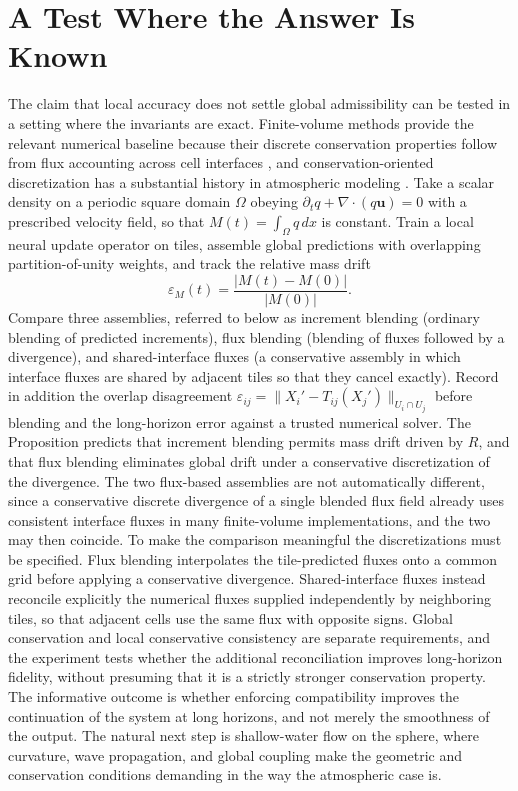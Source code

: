 \documentclass[11pt]{article}
\theoremstyle{definition}
\theoremstyle{remark}
\begin{document}
\section{A Test Where the Answer Is Known}

The claim that local accuracy does not settle global admissibility can be tested in a setting where the invariants are exact. Finite-volume methods provide the relevant numerical baseline because their discrete conservation properties follow from flux accounting across cell interfaces \cite{leveque2002finite}, and conservation-oriented discretization has a substantial history in atmospheric modeling \cite{arakawa1977computational}. Take a scalar density on a periodic square domain $\Omega$ obeying $\partial_t q + \nabla\!\cdot(q\mathbf u) = 0$ with a prescribed velocity field, so that $M(t) = \int_\Omega q\,dx$ is constant. Train a local neural update operator on tiles, assemble global predictions with overlapping partition-of-unity weights, and track the relative mass drift
\begin{equation}
\varepsilon_M(t) = \frac{|M(t)-M(0)|}{|M(0)|}.
\end{equation}
Compare three assemblies, referred to below as increment blending (ordinary blending of predicted increments), flux blending (blending of fluxes followed by a divergence), and shared-interface fluxes (a conservative assembly in which interface fluxes are shared by adjacent tiles so that they cancel exactly). Record in addition the overlap disagreement $\varepsilon_{ij} = \|X_i' - T_{ij}(X_j')\|_{U_i\cap U_j}$ before blending and the long-horizon error against a trusted numerical solver. The Proposition predicts that increment blending permits mass drift driven by $R$, and that flux blending eliminates global drift under a conservative discretization of the divergence. The two flux-based assemblies are not automatically different, since a conservative discrete divergence of a single blended flux field already uses consistent interface fluxes in many finite-volume implementations, and the two may then coincide. To make the comparison meaningful the discretizations must be specified. Flux blending interpolates the tile-predicted fluxes onto a common grid before applying a conservative divergence. Shared-interface fluxes instead reconcile explicitly the numerical fluxes supplied independently by neighboring tiles, so that adjacent cells use the same flux with opposite signs. Global conservation and local conservative consistency are separate requirements, and the experiment tests whether the additional reconciliation improves long-horizon fidelity, without presuming that it is a strictly stronger conservation property. The informative outcome is whether enforcing compatibility improves the continuation of the system at long horizons, and not merely the smoothness of the output. The natural next step is shallow-water flow on the sphere, where curvature, wave propagation, and global coupling make the geometric and conservation conditions demanding in the way the atmospheric case is.
\end{document}
